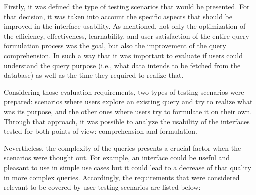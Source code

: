 Firstly, it was defined the type of testing scenarios that would be presented. For that decision, it was taken into account the specific aspects that should be improved in the interface usability. As mentioned, not only the optimization of the efficiency, effectiveness, learnability, and user satisfaction of the entire query formulation process was the goal, but also the improvement of the query comprehension. In such a way that it was important to evaluate if users could understand the query purpose (i.e., what data intends to be fetched from the database) as well as the time they required to realize that.

Considering those evaluation requirements, two types of testing scenarios were prepared: scenarios where users explore an existing query and try to realize what was its purpose, and the other ones where users try to formulate it on their own. Through that approach, it was possible to analyze the usability of the interfaces tested for both points of view: comprehension and formulation.

Nevertheless, the complexity of the queries presents a crucial factor when the scenarios were thought out. For example, an interface could be useful and pleasant to use in simple use cases but it could lead to a decrease of that quality in more complex queries. Accordingly, the requirements that were considered relevant to be covered by user testing scenarios are listed below:

